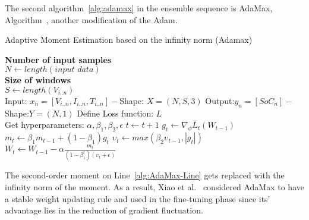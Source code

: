 %
%
The second algorithm~\ref{alg:adamax} in the ensemble sequence is AdaMax, Algorithm~\cite{kingma_adam_2017}, another modification of the Adam.
\begin{algorithm}
    \caption{Adaptive Moment Estimation based on the infinity norm (Adamax)}
    \begin{algorithmic}[1]
      \STATE \textbf{Number of input samples} \\ $N\gets length(\textit{input data})$\\
      \STATE \textbf{Size of windows} \\ $S\gets length(V_{i..n})$\\
      \STATE Input: $x_n = [V_{i..n}, I_{i..n}, T_{i..n}] - $Shape: $X = (N, S, 3)$
      \STATE Output:$y_n = [SoC_{n}] - $Shape:$Y = (N, 1)$
      \STATE Define Loss function: $L$ \\
             Get hyperparameters: $\alpha, \beta_1, \beta_2, \epsilon$
      \STATE $t \gets t+1$
      \STATE $g_t \gets \nabla_\phi L_t (W_{t-1})$ 
      \STATE $m_t \gets \beta_1 m_{t-1}+(1-\beta_1) g_t $ 
      \STATE $\upsilon_t \gets max\left(\beta_2\upsilon_{t-1}, |g_t|\right) $ 
      \STATE $W_t \gets W_{t-1}- \alpha \frac{m_t}{(1-\beta^t_1)(\upsilon_t+\epsilon)} $ 
      \ENDWHILE
    \end{algorithmic}
    \label{alg:adamax}
\end{algorithm}
The second-order moment on Line~\ref{alg:AdaMax-Line} gets replaced with the infinity norm of the moment.
As a result, Xiao et al.~\cite{xiao_accurate_2019} considered AdaMax to have a stable weight updating rule and used in the fine-tuning phase since its' advantage lies in the reduction of gradient fluctuation. 

